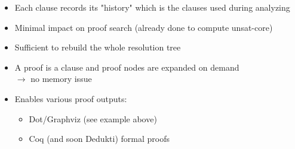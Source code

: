 \documentclass[portrait,a0,final]{a0poster}
\begin{document}
\begin{center}
\begin{multicols}{2}
{
  \inputminted{ocaml}{theory_intf.ml}
}

{
  \begin{itemize}[label=\checkmark]
    \item Each clause records its "history" which is the clauses
      used during analyzing
    \item Minimal impact on proof search (already done to compute
      unsat-core)
    \item Sufficient to rebuild the whole resolution tree
    \item A proof is a clause and proof nodes are expanded on demand\\
      $\rightarrow$ no memory issue
    \item Enables various proof outputs:
      \begin{itemize}[label=$\bullet$]
        \item Dot/Graphviz (see example above)
        \item Coq (and soon Dedukti) formal proofs
      \end{itemize}
  \end{itemize}
}


\end{multicols}
\end{center}
\end{document}
